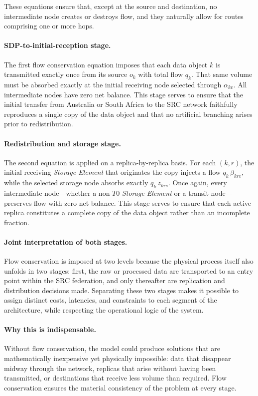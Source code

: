 \documentclass[a4paper,fleqn]{cas-dc}
\begin{document}
These equations ensure that, except at the source and destination, no intermediate node creates or destroys flow, and they naturally allow for routes comprising one or more hops.

\paragraph{SDP-to-initial-reception stage.} The first flow conservation equation imposes that each data object \(k\) is transmitted exactly once from its source \(o_k\) with total flow \(q_k\). That same volume must be absorbed exactly at the initial receiving node selected through \(\alpha_{kv}\). All intermediate nodes have zero net balance. This stage serves to ensure that the initial transfer from Australia or South Africa to the SRC network faithfully reproduces a single copy of the data object and that no artificial branching arises prior to redistribution.


\paragraph{Redistribution and storage stage.} The second equation is applied on a replica-by-replica basis. For each \((k,r)\), the initial receiving \emph{Storage Element} that originates the copy injects a flow \(q_k\,\beta_{krv}\), while the selected storage node absorbs exactly \(q_k\,z_{krs}\). Once again, every intermediate node—whether a non-\(T0\) \emph{Storage Element} or a transit node—preserves flow with zero net balance. This stage serves to ensure that each active replica constitutes a complete copy of the data object rather than an incomplete fraction.

\paragraph{Joint interpretation of both stages.} Flow conservation is imposed at two levels because the physical process itself also unfolds in two stages: first, the raw or processed data are transported to an entry point within the SRC federation, and only thereafter are replication and distribution decisions made. Separating these two stages makes it possible to assign distinct costs, latencies, and constraints to each segment of the architecture, while respecting the operational logic of the system.


\paragraph{Why this is indispensable.} Without flow conservation, the model could produce solutions that are mathematically inexpensive yet physically impossible: data that disappear midway through the network, replicas that arise without having been transmitted, or destinations that receive less volume than required. Flow conservation ensures the material consistency of the problem at every stage.
\end{document}

